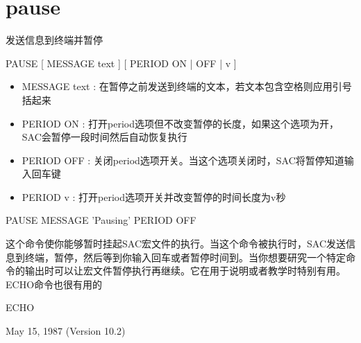 \section{pause}
\label{cmd:pause}

发送信息到终端并暂停

PAUSE [ MESSAGE text ] [ PERIOD ON | OFF | v ]

\begin{itemize}
\item MESSAGE text : 在暂停之前发送到终端的文本，若文本包含空格则应用引号括起来 
\item PERIOD ON : 打开period选项但不改变暂停的长度，如果这个选项为开，SAC会暂停一段时间然后自动恢复执行
\item PERIOD OFF : 关闭period选项开关。当这个选项关闭时，SAC将暂停知道输入回车键
\item PERIOD v : 打开period选项开关并改变暂停的时间长度为v秒
\end{itemize}

PAUSE MESSAGE 'Pausing' PERIOD OFF

这个命令使你能够暂时挂起SAC宏文件的执行。当这个命令被执行时，SAC发送信息到终端，暂停，然后等到你输入回车或者暂停时间到。当你想要研究一个特定命令的输出时可以让宏文件暂停执行再继续。它在用于说明或者教学时特别有用。ECHO命令也很有用的

ECHO

May 15, 1987 (Version 10.2)
